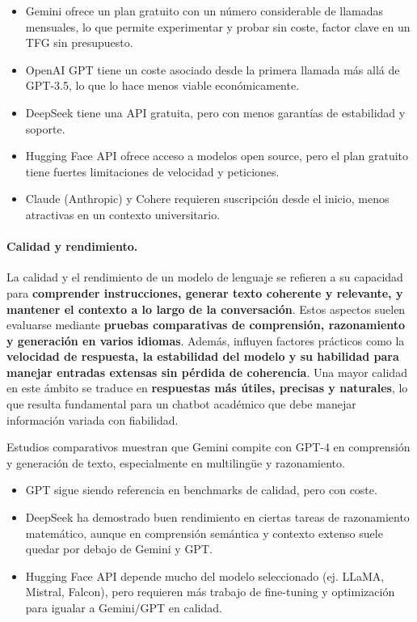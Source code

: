 \begin{itemize}
    \item Gemini ofrece un plan gratuito con un número considerable de llamadas mensuales, lo que permite experimentar y probar sin coste, factor clave en un TFG sin presupuesto.
    \item OpenAI GPT tiene un coste asociado desde la primera llamada más allá de GPT-3.5, lo que lo hace menos viable económicamente.
    \item DeepSeek tiene una API gratuita, pero con menos garantías de estabilidad y soporte.
    \item Hugging Face API ofrece acceso a modelos open source, pero el plan gratuito tiene fuertes limitaciones de velocidad y peticiones.
    \item Claude (Anthropic) y Cohere requieren suscripción desde el inicio, menos atractivas en un contexto universitario.
\end{itemize}

\paragraph{Calidad y rendimiento.}

La calidad y el rendimiento de un modelo de lenguaje se refieren a su capacidad para \textbf{comprender instrucciones, generar texto coherente y relevante, y mantener el contexto a lo largo de la conversación}. Estos aspectos suelen evaluarse mediante \textbf{pruebas comparativas de comprensión, razonamiento y generación en varios idiomas}. Además, influyen factores prácticos como la \textbf{velocidad de respuesta, la estabilidad del modelo y su habilidad para manejar entradas extensas sin pérdida de coherencia}. Una mayor calidad en este ámbito se traduce en \textbf{respuestas más útiles, precisas y naturales}, lo que resulta fundamental para un chatbot académico que debe manejar información variada con fiabilidad.

Estudios comparativos muestran que Gemini compite con GPT-4 en comprensión y generación de texto, especialmente en multilingüe y razonamiento.

\begin{itemize}
    \item GPT sigue siendo referencia en benchmarks de calidad, pero con coste.
    \item DeepSeek ha demostrado buen rendimiento en ciertas tareas de razonamiento matemático, aunque en comprensión semántica y contexto extenso suele quedar por debajo de Gemini y GPT.
    \item Hugging Face API depende mucho del modelo seleccionado (ej. LLaMA, Mistral, Falcon), pero requieren más trabajo de fine-tuning y optimización para igualar a Gemini/GPT en calidad.
\end{itemize}

